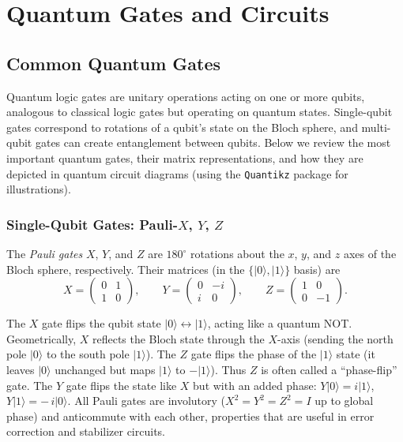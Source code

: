 \section{Quantum Gates and Circuits}
\label{sec:quantum-gates-and-circuits}
\subsection{Common Quantum Gates}

Quantum logic gates are unitary operations acting on one or more qubits, analogous to classical logic gates but operating on quantum states.\cite{NielsenChuang2010} Single-qubit gates correspond to rotations of a qubit’s state on the Bloch sphere, and multi-qubit gates can create entanglement between qubits.\cite{Barenco1995elementary} Below we review the most important quantum gates, their matrix representations, and how they are depicted in quantum circuit diagrams (using the {\tt Quantikz} package for illustrations).\cite{Koch2022quantikz}

\subsubsection*{Single-Qubit Gates: Pauli-$X$, $Y$, $Z$}

The \emph{Pauli gates} \(X\), \(Y\), and \(Z\) are \(180^{\circ}\) rotations about the
\(x\), \(y\), and \(z\) axes of the Bloch sphere, respectively\cite{NielsenChuang2010}.
Their matrices (in the \(\{|0\rangle,|1\rangle\}\) basis) are
\[
  X = \begin{pmatrix}0&1\\1&0\end{pmatrix}, \qquad
  Y = \begin{pmatrix}0&-i\\ i&0\end{pmatrix}, \qquad
  Z = \begin{pmatrix}1&0\\0&-1\end{pmatrix}.
\]


The $X$ gate flips the qubit state $|0\rangle \leftrightarrow |1\rangle$, acting like a quantum NOT.\cite{NCFlips} Geometrically, $X$ reflects the Bloch state through the $X$-axis (sending the north pole $|0\rangle$ to the south pole $|1\rangle$).\cite{Bloch1946} The $Z$ gate flips the phase of the $|1\rangle$ state (it leaves $|0\rangle$ unchanged but maps $|1\rangle$ to $-|1\rangle$).\cite{PhaseFlip} Thus $Z$ is often called a “phase-flip” gate.\cite{PhaseFlip} The $Y$ gate flips the state like $X$ but with an added phase: $Y|0\rangle = i|1\rangle$, $Y|1\rangle = -\,i|0\rangle$.\cite{NCFlips} All Pauli gates are involutory ($X^2=Y^2=Z^2=I$ up to global phase) and anticommute with each other, properties that are useful in error correction and stabilizer circuits.\cite{Gottesman1997stabilizer}

